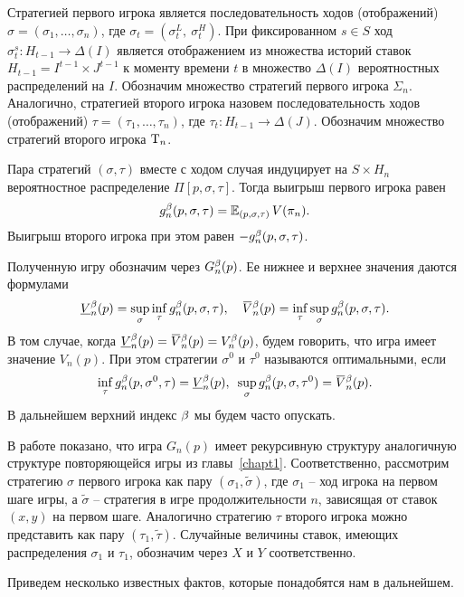 {Стратегией первого игрока является последовательность ходов (отображений) $\sigma = (\sigma_1, \ldots, \sigma_n)$, где $\sigma_t = (\sigma^L_t,\ \sigma^H_t)$.
При фиксированном $s \in S$ ход $\sigma^s_t: H_{t-1} \rightarrow \Delta(I)$ является отображением из множества историй ставок $H_{t-1} = I^{t-1} \times J^{t-1}$ к моменту времени $t$ в множество $\Delta(I)$ вероятностных распределений на $I$.
Обозначим множество стратегий первого игрока $\Sigma_n$.
Аналогично, стратегией второго игрока назовем последовательность ходов (отображений) $\tau = (\tau_1, \ldots, \tau_n)$, где $\tau_t: H_{t-1} \rightarrow \Delta(J)$.
Обозначим множество стратегий второго игрока $\mathrm{T}_n$.

Пара стратегий $(\sigma, \tau)$ вместе с ходом случая индуцирует на $S \times H_n$ вероятностное распределение $\Pi[p, \sigma, \tau]$.
Тогда выигрыш первого игрока равен
\[
  g^{\beta}_n(p, \sigma, \tau) = \operatorname{\mathbb{E}}_{( p, \sigma, \tau )} V(\pi_{n}).
\]
Выигрыш второго игрока при этом равен $-g^{\beta}_n(p, \sigma, \tau)$.

Полученную игру обозначим через $G^{\beta}_n(p)$. 
Ее нижнее и верхнее значения даются формулами
\begin{align*}
  \LV[\Co]{n}(p) = \sup_\sigma \inf_\tau g^\Co_n(p, \sigma, \tau), \quad
  \HV[\Co]{n}(p) = \inf_\tau \sup_\sigma g^\Co_n(p, \sigma, \tau).
\end{align*}
В том случае, когда $\LV[\Co]{n}(p) = \HV[\Co]{n}(p) = V^\Co_n(p)$, будем говорить, что игра имеет значение $V_n(p)$.
При этом стратегии $\sigma^0$ и $\tau^0$ называются оптимальными, если
\[
  \inf_\tau g^\Co_n(p, \sigma^0, \tau) = \LV[\Co]{n}(p), \enskip 
  \sup_\sigma g^\Co_n(p, \sigma, \tau^0) = \HV[\Co]{n}(p).
\]
В дальнейшем верхний индекс $\beta$ мы будем часто опускать.

В работе \cite{demeyer02} показано, что игра $G_n(p)$ имеет рекурсивную структуру аналогичную структуре повторяющейся игры из главы~\ref{chapt1}.
Соответственно, рассмотрим стратегию $\sigma$ первого игрока как пару $(\sigma_1, \tilde{\sigma})$, где $\sigma_1$ -- ход игрока на первом шаге игры, а $\tilde{\sigma}$ -- стратегия в игре продолжительности $n$, зависящая от ставок $(x, y)$ на первом шаге.
Аналогично стратегию $\tau$ второго игрока можно представить как пару $(\tau_1, \tilde{\tau})$.
Случайные величины ставок, имеющих распределения $\sigma_1$ и $\tau_1$, обозначим через $X$ и $Y$ соответственно.

Приведем несколько известных фактов, которые понадобятся нам в дальнейшем.

}
